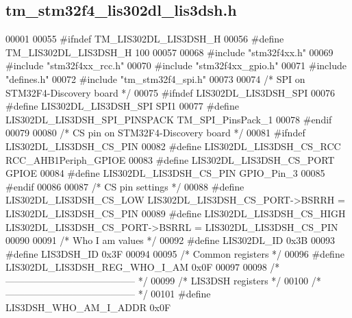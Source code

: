 \hypertarget{tm__stm32f4__lis302dl__lis3dsh_8h_source}{}\subsection{tm\+\_\+stm32f4\+\_\+lis302dl\+\_\+lis3dsh.\+h}

\begin{DoxyCode}
00001 
00055 \textcolor{preprocessor}{#ifndef TM\_LIS302DL\_LIS3DSH\_H}
00056 \textcolor{preprocessor}{#define TM\_LIS302DL\_LIS3DSH\_H 100}
00057 
00068 \textcolor{preprocessor}{#include "stm32f4xx.h"}
00069 \textcolor{preprocessor}{#include "stm32f4xx\_rcc.h"}
00070 \textcolor{preprocessor}{#include "stm32f4xx\_gpio.h"}
00071 \textcolor{preprocessor}{#include "defines.h"}
00072 \textcolor{preprocessor}{#include "tm\_stm32f4\_spi.h"}
00073 
00074 \textcolor{comment}{/* SPI on STM32F4-Discovery board */}
00075 \textcolor{preprocessor}{#ifndef LIS302DL\_LIS3DSH\_SPI}
00076 \textcolor{preprocessor}{#define LIS302DL\_LIS3DSH\_SPI                SPI1}
00077 \textcolor{preprocessor}{#define LIS302DL\_LIS3DSH\_SPI\_PINSPACK       TM\_SPI\_PinsPack\_1}
00078 \textcolor{preprocessor}{#endif}
00079 
00080 \textcolor{comment}{/* CS pin on STM32F4-Discovery board */}
00081 \textcolor{preprocessor}{#ifndef LIS302DL\_LIS3DSH\_CS\_PIN}
00082 \textcolor{preprocessor}{#define LIS302DL\_LIS3DSH\_CS\_RCC             RCC\_AHB1Periph\_GPIOE}
00083 \textcolor{preprocessor}{#define LIS302DL\_LIS3DSH\_CS\_PORT            GPIOE}
00084 \textcolor{preprocessor}{#define LIS302DL\_LIS3DSH\_CS\_PIN             GPIO\_Pin\_3}
00085 \textcolor{preprocessor}{#endif}
00086 
00087 \textcolor{comment}{/* CS pin settings */}
00088 \textcolor{preprocessor}{#define LIS302DL\_LIS3DSH\_CS\_LOW             LIS302DL\_LIS3DSH\_CS\_PORT->BSRRH = LIS302DL\_LIS3DSH\_CS\_PIN}
00089 \textcolor{preprocessor}{#define LIS302DL\_LIS3DSH\_CS\_HIGH            LIS302DL\_LIS3DSH\_CS\_PORT->BSRRL = LIS302DL\_LIS3DSH\_CS\_PIN}
00090 
00091 \textcolor{comment}{/* Who I am values */}
00092 \textcolor{preprocessor}{#define LIS302DL\_ID                         0x3B}
00093 \textcolor{preprocessor}{#define LIS3DSH\_ID                          0x3F}
00094 
00095 \textcolor{comment}{/* Common registers */}
00096 \textcolor{preprocessor}{#define LIS302DL\_LIS3DSH\_REG\_WHO\_I\_AM       0x0F}
00097 
00098 \textcolor{comment}{/* ----------------------------------------- */}
00099 \textcolor{comment}{/* LIS3DSH registers */}
00100 \textcolor{comment}{/* ----------------------------------------- */}
00101 \textcolor{preprocessor}{#define LIS3DSH\_WHO\_AM\_I\_ADDR               0x0F}

\end{DoxyCode}
